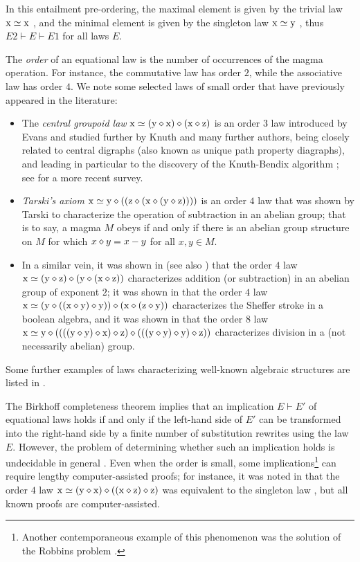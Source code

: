 In this entailment pre-ordering, the maximal element is given by the trivial law $\mathrm{x}\simeq\mathrm{x}$ , and the minimal element is given by the singleton law $\mathrm{x}\simeq \mathrm{y}$ , thus $E2 \vdash E \vdash E1$ for all laws $E$.

The \emph{order} of an equational law is the number of occurrences of the magma operation. For instance, the commutative law  has order $2$, while the associative law  has order $4$. We note some selected laws of small order that have previously appeared in the literature:
\begin{itemize}
\item The \emph{central groupoid law} $\mathrm{x} \simeq (\mathrm{y} \diamond \mathrm{x}) \diamond (\mathrm{x} \diamond \mathrm{z})$  is an order $3$ law introduced by Evans \cite{evans} and studied further by Knuth \cite{knuth} and many further authors, being closely related to central digraphs (also known as unique path property diagraphs), and leading in particular to the discovery of the Knuth-Bendix algorithm \cite{knuth-bendix}; see \cite{klt} for a more recent survey.
\item \emph{Tarski's axiom} $\mathrm{x} \simeq \mathrm{y} \diamond ( (\mathrm{z} \diamond (\mathrm{x} \diamond (\mathrm{y} \diamond \mathrm{z}))))$  is an order $4$ law that was shown by Tarski \cite{Tarski1938} to characterize the operation of subtraction in an abelian group; that is to say, a magma $M$ obeys  if and only if there is an abelian group structure on $M$ for which $x \diamond y = x-y$ for all $x,y \in M$.
\item In a similar vein, it was shown in \cite{mendelsohn-padmanabhan} (see also \cite{meredith-prior}) that the order $4$ law
$\mathrm{x} \simeq (\mathrm{y} \diamond \mathrm{z}) \diamond (\mathrm{y} \diamond (\mathrm{x} \diamond \mathrm{z}))$  characterizes addition (or subtraction) in an abelian group of exponent $2$; it was shown in \cite{mccune_et_al} that the order $4$ law $\mathrm{x} \simeq (\mathrm{y} \diamond ((\mathrm{x} \diamond \mathrm{y}) \diamond \mathrm{y})) \diamond (\mathrm{x} \diamond (\mathrm{z} \diamond \mathrm{y}))$  characterizes the Sheffer stroke in a boolean algebra, and it was shown in \cite{higman-neumann} that the order $8$ law
$\mathrm{x} \simeq \mathrm{y} \diamond ((((\mathrm{y} \diamond \mathrm{y}) \diamond \mathrm{x}) \diamond \mathrm{z}) \diamond (((\mathrm{y} \diamond \mathrm{y}) \diamond \mathrm{y}) \diamond \mathrm{z}))$  characterizes division in a (not necessarily abelian) group.
\end{itemize}
Some further examples of laws characterizing well-known algebraic structures are listed in \cite{mccune-survey}.

The Birkhoff completeness theorem \cite[Th. 3.5.14]{term-rewriting} implies that an implication $E \vdash E'$ of equational laws holds if and only if the left-hand side of $E'$ can be transformed into the right-hand side by a finite number of substitution rewrites using the law $E$. However, the problem of determining whether such an implication holds is undecidable in general \cite{mckenzie}. Even when the order is small, some implications\footnote{Another contemporaneous example of this phenomenon was the solution of the Robbins problem \cite{robbins}.} can require lengthy computer-assisted proofs; for instance, it was noted in \cite{Kisielewicz2} that the order $4$ law $\mathrm{x} \simeq (\mathrm{y} \diamond \mathrm{x}) \diamond ((\mathrm{x} \diamond \mathrm{z}) \diamond \mathrm{z})$  was equivalent to the singleton law , but all known proofs are computer-assisted.

